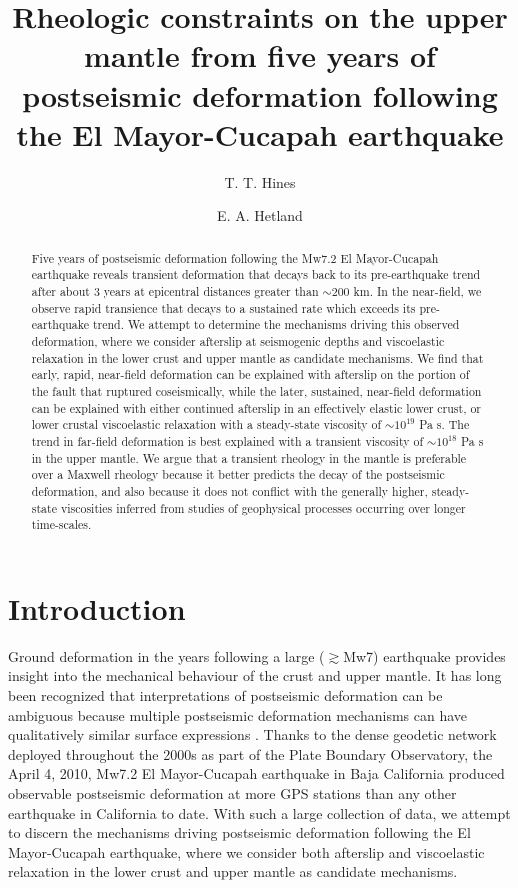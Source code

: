 \documentclass[review]{elsarticle}
\title{	
Rheologic constraints on the upper mantle from five years of postseismic deformation following the El Mayor-Cucapah earthquake}
\author{T. T. Hines\fnref{fn}}
\author{E. A. Hetland\fnref{fn}}
\begin{document}
\begin{abstract}
Five years of postseismic deformation following the  Mw7.2 El Mayor-Cucapah earthquake reveals transient deformation that decays back to its pre-earthquake trend after about 3 years at epicentral distances greater than $\sim200$ km. In the near-field, we observe rapid transience that decays to a sustained rate which exceeds its pre-earthquake trend.  We attempt to determine the mechanisms driving this observed deformation, where we consider afterslip at seismogenic depths and viscoelastic relaxation in the lower crust and upper mantle as candidate mechanisms.  We find that early, rapid, near-field deformation can be explained with afterslip on the portion of the fault that ruptured coseismically, while the later, sustained, near-field deformation can be explained with either continued afterslip in an effectively elastic lower crust, or lower crustal viscoelastic relaxation with a steady-state viscosity of $\sim10^{19}$ Pa s. The trend in far-field deformation is best explained with a transient viscosity of $\sim10^{18}$ Pa s in the upper mantle. We argue that a transient rheology in the mantle is preferable over a Maxwell rheology because it better predicts the decay of the postseismic deformation, and also because it does not conflict with the generally higher, steady-state viscosities inferred from studies of geophysical processes occurring over longer time-scales.
\end{abstract}
\maketitle

\section{Introduction}
Ground deformation in the years following a large ($\gtrsim$Mw7) earthquake provides insight into the mechanical behaviour of the crust and upper mantle. It has long been recognized that interpretations of postseismic deformation can be ambiguous because multiple postseismic deformation mechanisms can have qualitatively similar surface expressions \citep[e.g.][]{Savage1990}. Thanks to the dense geodetic network deployed throughout the 2000s as part of the Plate Boundary Observatory, the April 4, 2010, Mw7.2 El Mayor-Cucapah earthquake in Baja California produced observable postseismic deformation at more GPS stations than any other earthquake in California to date. With such a large collection of data, we attempt to discern the mechanisms driving postseismic deformation following the El Mayor-Cucapah earthquake, where we consider both afterslip and viscoelastic relaxation in the lower crust and upper mantle as candidate mechanisms. 
\end{document}
